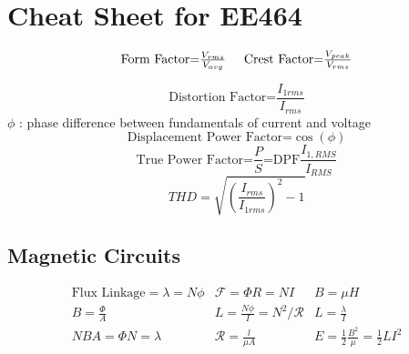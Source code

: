 \documentclass[twocolumn]{article}
\begin{document}
\section*{\normalsize Cheat Sheet for EE464}
\small \begin{equation*}
\textrm{Form Factor=}\textstyle\frac{V_{rms}}{V_{avg}} \hspace{0.5cm}
\textrm{Crest Factor=}\textstyle\frac{V_{peak}}{V_{rms}}
\end{equation*}

\begin{equation*}
\textrm{Distortion Factor=}\frac{I_{1rms}}{I_{rms}}
\end{equation*}
\textrm{$\phi$ : phase difference between fundamentals of current and voltage}
\begin{equation*}
\textrm{Displacement Power Factor=}\cos(\phi)
\end{equation*}
\begin{equation*}
\textstyle \textrm{True Power Factor=} \frac{P}{S}\textrm{=DPF} \frac{I_{1,RMS}}{I_{RMS}}
\end{equation*}
\begin{equation*}
\textstyle THD=\sqrt{(\frac{I_{rms}}{I_{1rms}})^2-1}
\end{equation*}

\vspace*{-0.55cm}
\subsection*{\small Magnetic Circuits}
\vspace*{-0.1cm}
\begin{equation*}
\begin{array}{c|c|c}
\textstyle \textrm{Flux Linkage}=\lambda=N\phi & \textstyle \mathcal{F}=\Phi R  = NI & \textstyle B = \mu H \\
\textstyle B = \frac{\Phi}{A} & \textstyle L=\frac{N\phi}{I} = N^2 /\mathcal{R} & \textstyle L=\frac{\lambda}{I}\\
\textstyle N B A = \Phi N = \lambda & \textstyle \mathcal{R}=\frac{l}{\mu A} & E = \frac{1}{2} \frac{B^2}{\mu} = \frac{1}{2} L I^2\\
\end{array}
\end{equation*}

\vspace*{-0.4cm}
\end{document}
